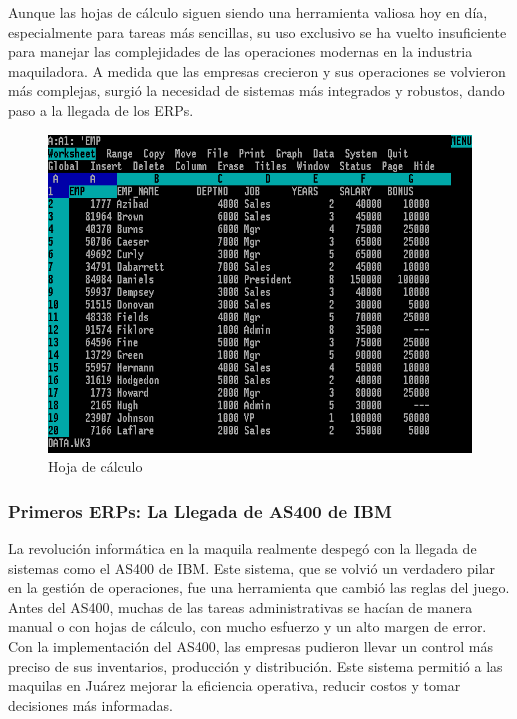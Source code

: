 \documentclass[
  10pt,
  letterpaper,
]{book}
\begin{document}
Aunque las hojas de cálculo siguen siendo una herramienta valiosa hoy en
día, especialmente para tareas más sencillas, su uso exclusivo se ha
vuelto insuficiente para manejar las complejidades de las operaciones
modernas en la industria maquiladora. A medida que las empresas
crecieron y sus operaciones se volvieron más complejas, surgió la
necesidad de sistemas más integrados y robustos, dando paso a la llegada
de los ERPs.

\begin{figure}[H]

{\centering \includegraphics{Img/Lotus.png}

}

\caption{Hoja de cálculo}

\end{figure}%

\subsubsection{Primeros ERPs: La Llegada de AS400 de
IBM}\label{primeros-erps-la-llegada-de-as400-de-ibm}

La revolución informática en la maquila realmente despegó con la llegada
de sistemas como el AS400 de IBM. Este sistema, que se volvió un
verdadero pilar en la gestión de operaciones, fue una herramienta que
cambió las reglas del juego. Antes del AS400, muchas de las tareas
administrativas se hacían de manera manual o con hojas de cálculo, con
mucho esfuerzo y un alto margen de error. Con la implementación del
AS400, las empresas pudieron llevar un control más preciso de sus
inventarios, producción y distribución. Este sistema permitió a las
maquilas en Juárez mejorar la eficiencia operativa, reducir costos y
tomar decisiones más informadas.
\end{document}
